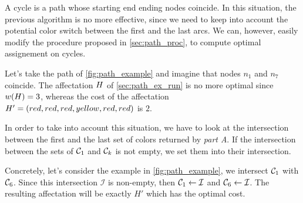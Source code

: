 A cycle is a path whose starting end ending nodes coincide.
In this situation, the previous algorithm is no more effective, since we need to keep into account the potential color switch between the first and the last arcs.
We can, however, easily modify the procedure proposed in \cref{sec:path_proc}, to compute optimal assignement on cycles.

Let's take the path of \cref{fig:path_example} and imagine that nodes $n_1$ and $n_7$ coincide.
The affectation $H$ of \cref{sec:path_ex_run} is no more optimal since $w(H) = 3$, whereas the cost of the affectation $H' = (red, red, red, yellow, red, red)$ is $2$.

In order to take into account this situation, we have to look at the intersection between the first and the last set of colors returned by \textit{part A}. If the intersection between the sets of $\mathcal{C}_1$ and $\mathcal{C}_k$ is not empty, we set them into their intersection.

Concretely, let's consider the example in \cref{fig:path_example}, we intersect $\mathcal{C}_1$ with $\mathcal{C}_6$. Since this intersection $\mathcal{I}$ is non-empty, then $\mathcal{C}_1 \gets \mathcal{I}$ and $\mathcal{C}_6 \gets \mathcal{I}$. The resulting affectation will be exactly $H'$ which has the optimal cost.


